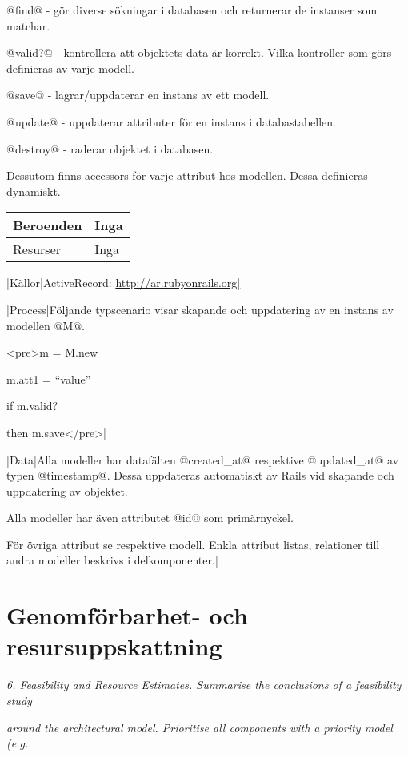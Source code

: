 \documentclass[a4paper, twoside, 11pt, titlepage]{article}
\begin{document}
			@find@ - gör diverse sökningar i databasen och returnerar de instanser som matchar.

			@valid?@ - kontrollera att objektets data är korrekt. Vilka kontroller som görs definieras av varje modell.

			@save@ - lagrar/uppdaterar en instans av ett modell.

			@update@ - uppdaterar attributer för en instans i databastabellen.

			@destroy@ - raderar objektet i databasen.

			Dessutom finns accessors för varje attribut hos modellen. Dessa definieras dynamiskt.|

			\begin {table} [ht] \begin{tabular} {  p{3.5cm} p{9.6cm} }
				\hline
				Beroenden & Inga  \\
				\hline
				Resurser & Inga  \\
				\hline
			\end{tabular} \end{table} \FloatBarrier
			\vspace{6mm}

			|Källor|ActiveRecord: \url{http://ar.rubyonrails.org|}

			|Process|Följande typscenario visar skapande och uppdatering av en instans av modellen @M@.

			<pre>m = M.new

			m.att1 = ``value''

			if m.valid?

			then m.save</pre>|

			|Data|Alla modeller har datafälten @created\_at@ respektive @updated\_at@ av typen @timestamp@. Dessa uppdateras automatiskt av Rails vid skapande och uppdatering av objektet.

			Alla modeller har även attributet @id@ som primärnyckel.

			För övriga attribut se respektive modell. Enkla attribut listas, relationer till andra modeller beskrivs i delkomponenter.|

\clearpage
\section{Genomförbarhet- och resursuppskattning}


\emph{6. Feasibility and Resource Estimates. Summarise the conclusions of a feasibility study}

\emph{around the architectural model. Prioritise all components with a priority model (e.g.}
\end{document}
